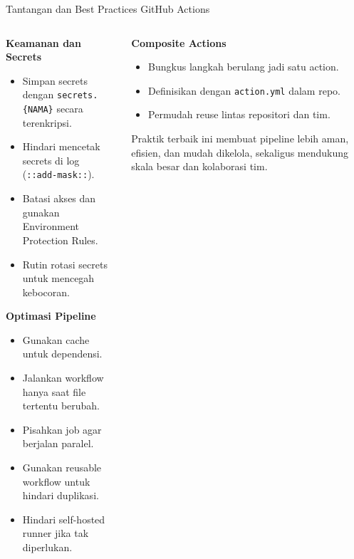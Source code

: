 \documentclass[aspectratio=169, table]{beamer}
\begin{document}
\begin{frame}[fragile]{Tantangan dan Best Practices GitHub Actions}
	\vspace{20pt}
	
	\begin{columns}[T]
		\begin{column}{0.66\textwidth}
			\textbf{Keamanan dan Secrets}
			\begin{itemize}
				\item Simpan secrets dengan \texttt{secrets.\{NAMA\}} secara terenkripsi.
				\item Hindari mencetak secrets di log (\texttt{::add-mask::}).
				\item Batasi akses dan gunakan Environment Protection Rules.
				\item Rutin rotasi secrets untuk mencegah kebocoran.
			\end{itemize}
			
			\vspace{4pt}
			\textbf{Optimasi Pipeline}
			\begin{itemize}
				\item Gunakan cache untuk dependensi.
				\item Jalankan workflow hanya saat file tertentu berubah.
				\item Pisahkan job agar berjalan paralel.
				\item Gunakan reusable workflow untuk hindari duplikasi.
				\item Hindari self-hosted runner jika tak diperlukan.
			\end{itemize}
		\end{column}
		
		\begin{column}{0.34\textwidth}
			\textbf{Composite Actions}
			\begin{itemize}
				\item Bungkus langkah berulang jadi satu action.
				\item Definisikan dengan \texttt{action.yml} dalam repo.
				\item Permudah reuse lintas repositori dan tim.
			\end{itemize}
			
			\vspace{6pt}
			Praktik terbaik ini membuat pipeline lebih aman, efisien, dan mudah dikelola, sekaligus mendukung skala besar dan kolaborasi tim.
		\end{column}
	\end{columns}
\end{frame}
\end{document}
